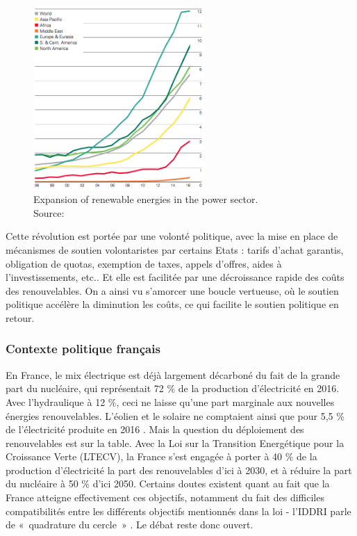 \begin{figure}[!ht]
	\centering
	\includegraphics[height=7cm]{figures/BP_ENR_Expansion.png}
	\caption[Expansion of renewable energies in the power sector]{Expansion of renewable energies in the power sector.\\Source: \citet[p. 43]{BP2017}}
\end{figure}

Cette révolution est portée par une volonté politique, avec la mise en place de mécanismes de soutien volontaristes par certains Etats : tarifs d’achat garantis, obligation de quotas, exemption de taxes, appels d’offres, aides à l’investissements, etc.\citep{EuropeanCommission2013}. Et elle est facilitée par une décroissance rapide des coûts des renouvelables. On a ainsi vu s’amorcer une boucle vertueuse, où le soutien politique accélère la diminution les coûts, ce qui facilite le soutien politique en retour.

\subsubsection{Contexte politique français}
En France, le mix électrique est déjà largement décarboné du fait de la grande part du nucléaire, qui représentait 72 \% de la production d’électricité en 2016. Avec l’hydraulique à 12 \%, ceci ne laisse qu’une part marginale aux nouvelles énergies renouvelables. L’éolien et le solaire ne comptaient ainsi que pour 5,5 \% de l'électricité produite en 2016 \citet{RTE2016}. 
Mais la question du déploiement des renouvelables est sur la table. Avec la Loi sur la Transition Energétique pour la Croissance Verte (LTECV), la France s’est engagée à porter à 40 \% de la production d’électricité la part des renouvelables d’ici à 2030, et à réduire la part du nucléaire à 50 \% d’ici 2050. Certains doutes existent quant au fait que la France atteigne effectivement ces objectifs, notamment du fait des difficiles compatibilités entre les différents objectifs mentionnés dans la loi - l’IDDRI parle de «~quadrature du cercle~» \citep{Rudinger2017}. Le débat reste donc ouvert.

